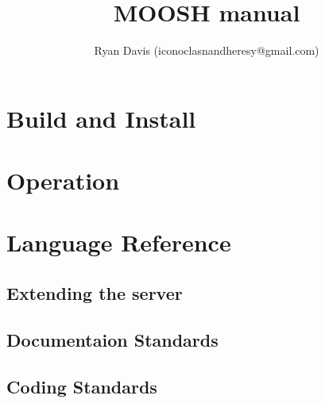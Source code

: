 \documentclass[10pt,twocolumn,letterpaer]{book}
\author{Ryan Davis (iconoclasnandheresy@gmail.com)}
\title{MOOSH manual}
\begin{document}
\maketitle
\frontmatter
\tableofcontets

\mainmatter
\part{Build and Install}
\part{Operation}
\part{Language Reference}
\backmatter
\chapter{Extending the server}
\chapter{Documentaion Standards}
\chapter{Coding Standards}
\end{document}
